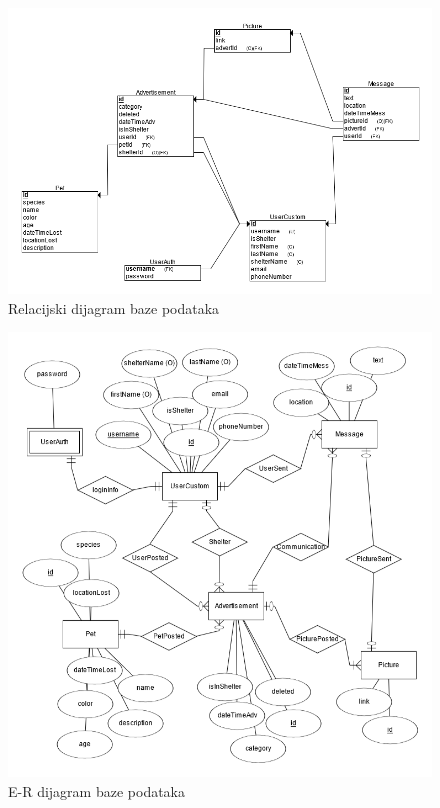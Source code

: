 				\begin{figure}[H]
					\includegraphics[scale=0.63]{dijagrami/dijagramBaze/relacijskiModel.PNG} %
					\centering
					\caption{Relacijski dijagram baze podataka}
					\label{fig:relDijagram}
				\end{figure}

				\begin{figure}[H]
					\includegraphics[scale=0.65]{dijagrami/dijagramBaze/ERmodel.PNG} %
					\centering
					\caption{E-R dijagram baze podataka}
					\label{fig:erDijagram}
				\end{figure}

